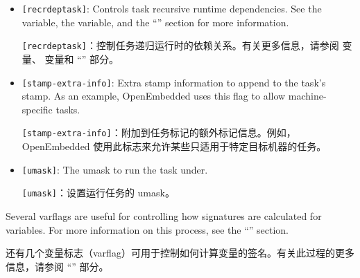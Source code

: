 \begin{itemize}
\item \texttt{[recrdeptask]}: Controls task recursive runtime dependencies. See the  variable, the  variable, and the ``'' section for more information.

\medskip
\texttt{[recrdeptask]}：控制任务递归运行时的依赖关系。有关更多信息，请参阅  变量、  变量和 ``'' 部分。

\item \texttt{[stamp-extra-info]}: Extra stamp information to append to the task's stamp. As an example, OpenEmbedded uses this flag to allow machine-specific tasks.

\medskip
\texttt{[stamp-extra-info]}：附加到任务标记的额外标记信息。例如，OpenEmbedded 使用此标志来允许某些只适用于特定目标机器的任务。

\item \texttt{[umask]}: The umask to run the task under.

\medskip
\texttt{[umask]}：设置运行任务的 umask\footnotemark[1]。


\end{itemize}

Several varflags are useful for controlling how signatures are calculated for variables. For more information on this process, see the ``'' section.

还有几个变量标志（varflag）可用于控制如何计算变量的签名。有关此过程的更多信息，请参阅 ``'' 部分。

